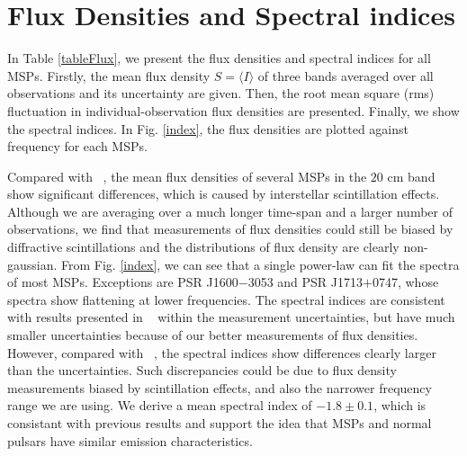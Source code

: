 \documentclass[useAMS,usenatbib]{mn2e}
\begin{document}
\section{Flux Densities and Spectral indices}

In Table \ref{tableFlux}, we present the flux densities and spectral indices 
for all MSPs.
%
Firstly, the mean flux density $S=\langle I\rangle$ of three bands averaged over all 
observations and its uncertainty are given. 
%
Then, the root mean square (rms) fluctuation in individual-observation flux 
densities are presented. Finally, we show the spectral indices.
%
In Fig. \ref{index}, the flux densities are plotted against frequency for each 
MSPs.
%

Compared with ~\citet{Yan11}, the mean flux densities of several MSPs in the $20$ cm 
band show significant differences, which is caused by interstellar scintillation effects.
%
Although we are averaging over a much longer time-span and a larger number of observations, 
we find that measurements of flux densities could still be biased by diffractive 
scintillations and the distributions of flux density are clearly non-gaussian.
%
From Fig. \ref{index}, we can see that a single power-law can fit the spectra 
of most MSPs. Exceptions are PSR J1600$-$3053 and PSR J1713$+$0747, whose spectra show 
flattening at lower frequencies.
%
The spectral indices are consistent with results presented in ~\citet{Toscano98} within 
the measurement uncertainties, but have much smaller uncertainties because of our 
better measurements of flux densities. 
%
However, compared with ~\citet{Kramer99}, the spectral indices show differences 
clearly larger than the uncertainties.
%
Such discrepancies could be due to flux density measurements biased by scintillation 
effects, and also the narrower frequency range we are using.
%
We derive a mean spectral index of $-1.8\pm0.1$, which is consistant with previous 
results and support the idea that MSPs and normal pulsars have similar emission 
characteristics.
%
\end{document}
